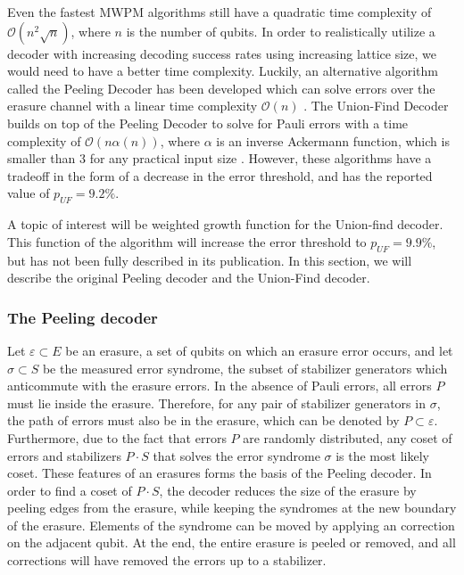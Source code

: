 Even the fastest MWPM algorithms still have a quadratic time complexity of $\mathcal{O}(n^2\sqrt{n})$, where $n$ is the number of qubits. In order to realistically utilize a decoder with increasing decoding success rates using increasing lattice size, we would need to have a better time complexity. Luckily, an alternative algorithm called the Peeling Decoder has been developed which can solve errors over the erasure channel with a linear time complexity $\mathcal{O}(n)$ \cite{delfosse2017}. The Union-Find Decoder builds on top of the Peeling Decoder to solve for Pauli errors with a time complexity of $\mathcal{O}(n\alpha(n))$, where $\alpha$ is an inverse Ackermann function, which is smaller than 3 for any practical input size \cite{nickerson2017}. However, these algorithms have a tradeoff in the form of a decrease in the error threshold, and has the reported value of $p_{UF} = 9.2\%$.

A topic of interest will be weighted growth function for the Union-find decoder. This function of the algorithm will increase the error threshold to $p_{UF} = 9.9\%$, but has not been fully described in its publication.  In this section, we will describe the original Peeling decoder and the Union-Find decoder.   \\

\subsubsection{The Peeling decoder}
Let $\varepsilon \subset E$ be an erasure, a set of qubits on which an erasure error occurs, and let $\sigma \subset S$ be the measured error syndrome, the subset of stabilizer generators which anticommute with the erasure errors. In the absence of Pauli errors, all errors $P$ must lie inside the erasure. Therefore, for any pair of stabilizer generators in $\sigma$, the path of errors must also be in the erasure, which can be denoted by $P\subset \varepsilon$. Furthermore, due to the fact that errors $P$ are randomly distributed, any coset of errors and stabilizers $P\cdot S$ that solves the error syndrome $\sigma$ is the most likely coset. These features of an erasures forms the basis of the Peeling decoder. In order to find a coset of $P \cdot S$, the decoder reduces the size of the erasure by peeling edges from the erasure, while keeping the syndromes at the new boundary of the erasure. Elements of the syndrome can be moved by applying an correction on the adjacent qubit. At the end, the entire erasure is peeled or removed, and all corrections will have removed the errors up to a stabilizer.


